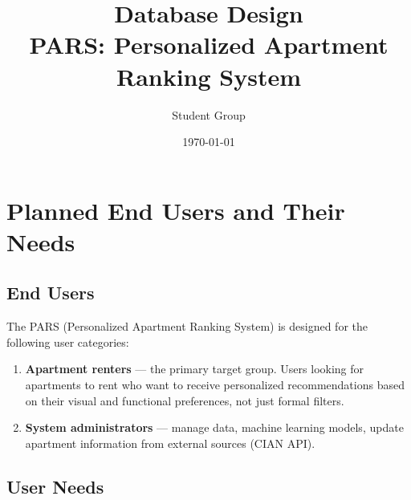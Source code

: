 \documentclass[12pt,a4paper]{article}
\title{Database Design\\PARS: Personalized Apartment Ranking System}
\author{Student Group}
\date{\today}
\begin{document}
\maketitle
\tableofcontents
\newpage

\section{Planned End Users and Their Needs}

\subsection{End Users}

The PARS (Personalized Apartment Ranking System) is designed for the following user categories:

\begin{enumerate}
    \item \textbf{Apartment renters} — the primary target group. Users looking for apartments to rent who want to receive personalized recommendations based on their visual and functional preferences, not just formal filters.
    
    \item \textbf{System administrators} — manage data, machine learning models, update apartment information from external sources (CIAN API).
\end{enumerate}

\subsection{User Needs}
\end{document}

